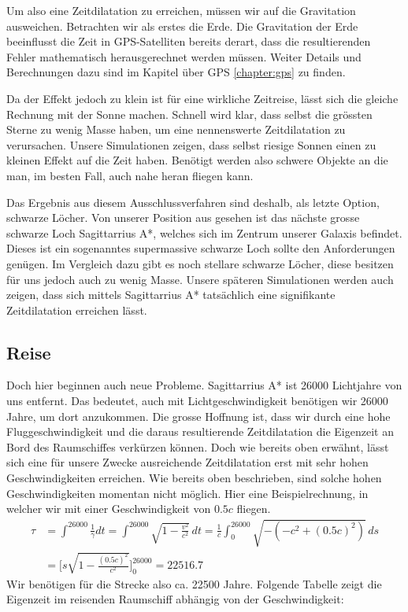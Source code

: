 \begin{refsection}
    Um also eine Zeitdilatation zu erreichen, müssen wir auf die Gravitation ausweichen. Betrachten wir als erstes die Erde. Die Gravitation der Erde beeinflusst die Zeit in GPS-Satelliten bereits derart, dass die resultierenden Fehler mathematisch herausgerechnet werden müssen. Weiter Details und Berechnungen dazu  sind im Kapitel über GPS \ref{chapter:gps} zu finden. %
    
    Da der Effekt jedoch zu klein ist für eine wirkliche Zeitreise, lässt sich die gleiche Rechnung mit der Sonne machen. Schnell wird klar, dass selbst die grössten Sterne zu wenig Masse haben, um eine nennenswerte Zeitdilatation zu verursachen. Unsere Simulationen zeigen, dass selbst riesige Sonnen einen zu kleinen Effekt auf die Zeit haben.
    Benötigt werden also schwere Objekte an die man, im besten Fall, auch nahe heran fliegen kann. 
    
    Das Ergebnis aus diesem Ausschlussverfahren sind deshalb, als letzte Option, schwarze Löcher. Von unserer Position aus gesehen ist das nächste grosse schwarze Loch Sagittarrius A*, welches sich im Zentrum unserer Galaxis befindet. Dieses ist ein sogenanntes supermassive schwarze Loch sollte den Anforderungen genügen. Im Vergleich dazu gibt es noch stellare schwarze Löcher, diese besitzen für uns jedoch auch zu wenig Masse. Unsere späteren Simulationen werden auch zeigen, dass sich mittels Sagittarrius A* tatsächlich eine signifikante Zeitdilatation erreichen lässt.
    
    \subsection{Reise}
    
    Doch hier beginnen auch neue Probleme. Sagittarrius A* ist 26000 Lichtjahre von uns entfernt. Das bedeutet, auch mit Lichtgeschwindigkeit benötigen wir 26000 Jahre, um dort anzukommen. Die grosse Hoffnung ist, dass wir durch eine hohe Fluggeschwindigkeit und die daraus resultierende Zeitdilatation die Eigenzeit an Bord des Raumschiffes verkürzen können. 
    Doch wie bereits oben erwähnt, lässt sich eine für unsere Zwecke ausreichende Zeitdilatation erst mit sehr hohen Geschwindigkeiten erreichen. Wie bereits oben beschrieben, sind solche hohen Geschwindigkeiten momentan nicht möglich.
    Hier eine Beispielrechnung, in welcher wir mit einer Geschwindigkeit von $0.5c$ fliegen.
	\begin{align*}
	\tau
	&= 
	\int_{}^{26000}\frac{1}{\gamma}dt=\int_{}^{26000}\sqrt{1-\frac{v^2}{c^2}}\,dt
	= 
	\frac{1}{c}\int_{0}^{26000}\sqrt{-(-c^2+(0.5c)^2)}\,ds\\
	&=
	\biggl[s\sqrt{1-\frac{(0.5c)^{2}}{c^2}}\biggr]_0^{26000}
	=
	22516.7
	\end{align*}
	Wir benötigen für die Strecke also ca. 22500 Jahre.
	Folgende Tabelle zeigt die Eigenzeit im reisenden Raumschiff abhängig von der Geschwindigkeit:
	

\end{refsection}
